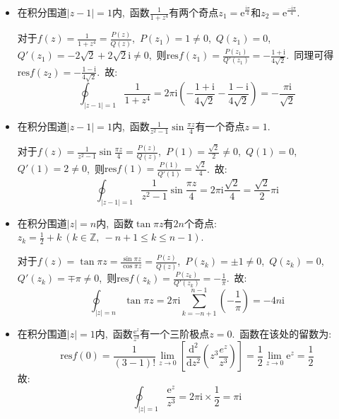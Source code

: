 \documentclass[a4paper,fontset=windows]{ctexart}
\begin{document}
\begin{itemize}
\bigskip
\item[4.(1)]
在积分围道$|z-1|=1$内,\ 函数$\frac{1}{1+z^4}$有两个奇点$z_1=\mathrm{e}^{\frac{\mathrm{i}\pi}{4}}$和$z_2=\mathrm{e}^{\frac{-\mathrm{i}\pi}{4}}$.

对于$f(z)=\frac{1}{1+z^4}=\frac{P(z)}{Q(z)}$,\ $P(z_1)=1\neq0$,\ $Q(z_1)=0$,\ $Q'(z_1)=-2\sqrt{2}+2\sqrt{2}\mathrm{i}\neq0$,\ 则$\mathrm{res}f(z_1)=\frac{P(z_1)}{Q'(z_1)}=-\frac{1+\mathrm{i}}{4\sqrt{2}}$.\ 同理可得$\mathrm{res}f(z_2)=-\frac{1-\mathrm{i}}{4\sqrt{2}}$.\ 故:
\[
\oint_{|z-1|=1}\frac{1}{1+z^4}
=2\pi \mathrm{i}\left(-\frac{1+\mathrm{i}}{4\sqrt{2}}-\frac{1-\mathrm{i}}{4\sqrt{2}}\right)
=-\frac{\pi \mathrm{i}}{\sqrt{2}}
\]

\smallskip
\item[4.(3)]
在积分围道$|z-1|=1$内,\ 函数$\frac{1}{z^2-1}\sin \frac{\pi z}{4}$有一个奇点$z=1$.\ 

对于$f(z)=\frac{1}{z^2-1}\sin \frac{\pi z}{4}=\frac{P(z)}{Q(z)}$,\ $P(1)=\frac{\sqrt{2}}{2}\neq0$,\ $Q(1)=0$,\ $Q'(1)=2\neq0$,\ 则$\mathrm{res}f(1)=\frac{P(1)}{Q'(1)}=\frac{\sqrt{2}}{4}$.\ 故:
\[
\oint_{|z-1|=1}\frac{1}{z^2-1}\sin \frac{\pi z}{4}
=2\pi \mathrm{i}\frac{\sqrt{2}}{4}
=\frac{\sqrt{2}}{2}\pi \mathrm{i}
\]

\smallskip
\item[4.(5)]
在积分围道$|z|=n$内,\ 函数$\tan \pi z$有$2n$个奇点:$z_k=\frac{1}{2}+k\ (k\in \mathbb{Z},\ -n+1\leqslant k\leqslant n-1)$.\ 

对于$f(z)=\tan \pi z=\frac{\sin \pi z}{\cos \pi z}=\frac{P(z)}{Q(z)}$,\ $P(z_k)=\pm1\neq0$,\ $Q(z_k)=0$,\ $Q'(z_k)=\mp\pi\neq0$,\ 则$\mathrm{res}f(z_k)=\frac{P(z_k)}{Q'(z_k)}=-\frac{1}{\pi}$.\ 故:
\[
\oint_{|z|=n}\tan \pi z
=2\pi\mathrm{i}\sum_{k=-n+1}^{n-1}\left(-\frac{1}{\pi}\right)
=-4n\mathrm{i}
\]

\smallskip
\item[4.(7)]
在积分围道$|z|=1$内,\ 函数$\frac{\mathrm{e}^z}{z^3}$有一个三阶极点$z=0$.\ 函数在该处的留数为:
\[
\mathrm{res}f(0)
=\frac{1}{(3-1)!}{\lim_{z \to 0}}\left[\frac{\mathrm{d}^2}{\mathrm{d}z^2}\left( z^3\frac{e^z}{z^3}\right)\right]
=\frac{1}{2}{\lim_{z \to 0}}\mathrm{e}^z
=\frac{1}{2}
\]
故:
\[
\oint_{|z|=1}\frac{\mathrm{e}^z}{z^3}
=2\pi \mathrm{i}\times\frac{1}{2}
=\pi \mathrm{i}
\]


\end{itemize}
\end{document}
